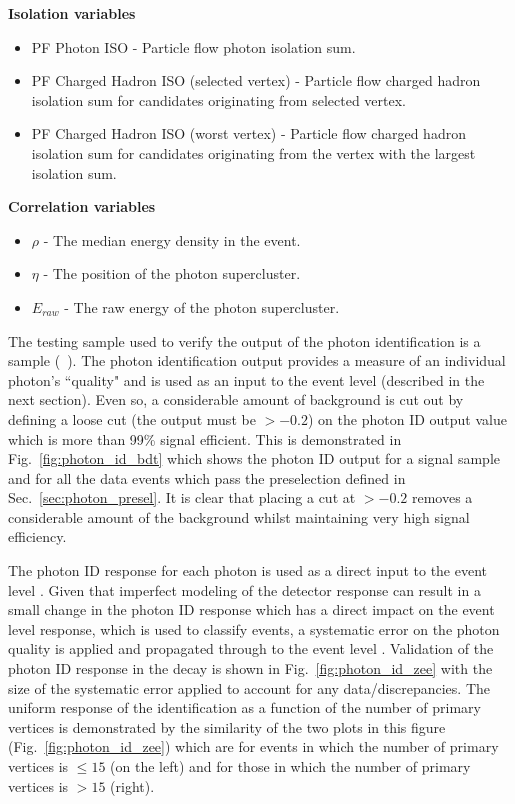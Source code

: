 \noindent\textbf{Isolation variables}
\begin{itemize}
  \item PF Photon ISO - Particle flow photon isolation sum.
  \item PF Charged Hadron ISO (selected vertex) - Particle flow charged hadron isolation sum for candidates originating from selected vertex.
  \item PF Charged Hadron ISO (worst vertex) - Particle flow charged hadron isolation sum for candidates originating from the vertex with the largest isolation sum.
\end{itemize}

\noindent\textbf{Correlation variables}
\begin{itemize}
  \item $\rho$ - The median energy density in the event.
  \item $\eta$ - The \eta position of the photon supercluster.
  \item $E_{raw}$ - The raw energy of the photon supercluster.
\end{itemize}

The testing sample used to verify the output of the photon identification \BDT is a \MC \Hgg sample (~\GeV). The photon identification \BDT output provides a measure of an individual photon's ``quality" and is used as an input to the event level \BDT (described in the next section). Even so, a considerable amount of background is cut out by defining a loose cut (the \BDT output must be $>-0.2$) on the photon ID \BDT output value which is more than 99\% signal efficient. This is demonstrated in Fig.~\ref{fig:photon_id_bdt} which shows the photon ID \BDT output for a \Hgg signal \MC sample and for all the data events which pass the preselection defined in Sec.~\ref{sec:photon_presel}. It is clear that placing a cut at $>-0.2$ removes a considerable amount of the background whilst maintaining very high signal efficiency. 

The photon ID \BDT response for each photon is used as a direct input to the event level \MVA. Given that imperfect modeling of the detector response can result in a small change in the photon ID response which has a direct impact on the event level \MVA response, which is used to classify events, a systematic error on the photon quality is applied and propagated through to the event level \MVA. Validation of the photon ID \BDT response in the \Zee decay is shown in Fig.~\ref{fig:photon_id_zee} with the size of the systematic error applied to account for any data/\MC discrepancies. The uniform response of the identification as a function of the number of primary vertices is demonstrated by the similarity of the two plots in this figure (Fig.~\ref{fig:photon_id_zee}) which are for events in which the number of primary vertices is $\leq 15$ (on the left) and for those in which the number of primary vertices is $>15$ (right).

